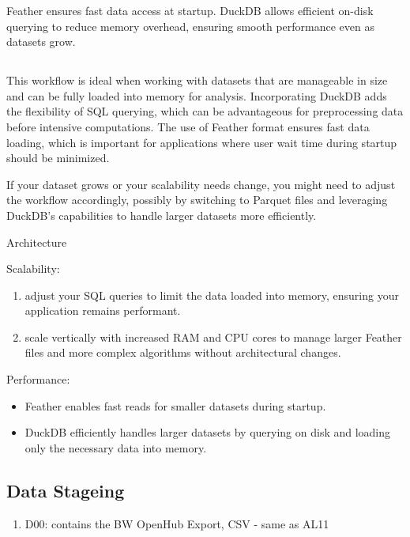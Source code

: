 \documentclass[
  american,
  10,
  a4paper,
]{book}
\providecommand{\tightlist}{%
  \setlength{\itemsep}{0pt}\setlength{\parskip}{0pt}}
\theoremstyle{definition}
\theoremstyle{remark}
\begin{document}
Feather ensures fast data access at startup. DuckDB allows efficient
on-disk querying to reduce memory overhead, ensuring smooth performance
even as datasets grow.

\subsection{}\label{section}

This workflow is ideal when working with datasets that are manageable in
size and can be fully loaded into memory for analysis. Incorporating
DuckDB adds the flexibility of SQL querying, which can be advantageous
for preprocessing data before intensive computations. The use of Feather
format ensures fast data loading, which is important for applications
where user wait time during startup should be minimized.

If your dataset grows or your scalability needs change, you might need
to adjust the workflow accordingly, possibly by switching to Parquet
files and leveraging DuckDB's capabilities to handle larger datasets
more efficiently.

Architecture

Scalability:

\begin{enumerate}
\def\labelenumi{\arabic{enumi}.}
\item
  adjust your SQL queries to limit the data loaded into memory, ensuring
  your application remains performant.
\item
  scale vertically with increased RAM and CPU cores to manage larger
  Feather files and more complex algorithms without architectural
  changes.
\end{enumerate}

Performance:

\begin{itemize}
\tightlist
\item
  Feather enables fast reads for smaller datasets during startup.
\item
  DuckDB efficiently handles larger datasets by querying on disk and
  loading only the necessary data into memory.
\end{itemize}

\subsection{Data Stageing}\label{data-stageing}

\begin{enumerate}
\def\labelenumi{\arabic{enumi}.}
\tightlist
\item
  D00: contains the BW OpenHub Export, CSV - same as AL11
\end{enumerate}
\end{document}
